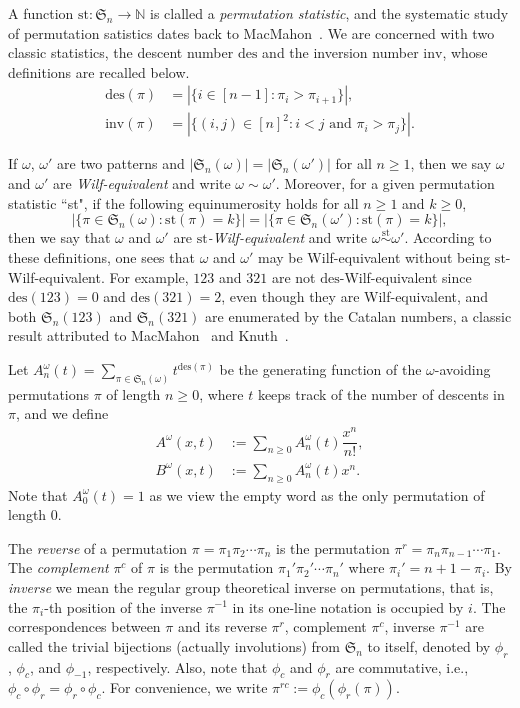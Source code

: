 \documentclass[11pt,reqno]{amsart}
\numberwithin{equation}{section}
\theoremstyle{plain}
\theoremstyle{definition}
\renewcommand{\S}{\mathfrak{S}}
\def\des{\mathrm{des}}
\def\st{\mathrm{st}}
\def\inv{\mathrm{inv}}
\begin{document}
A function $\st:\S_n \to \mathbb{N} $ is clalled a \textit{permutation statistic}, and the systematic study of permutation
satistics dates back to MacMahon~\cite{mac60}. We are concerned with two classic statistics, the descent number $\des$ and the inversion number $\inv$, whose definitions are recalled below.
\begin{align*} 
\des(\pi) &= |\{i \in [n-1]:\pi_i>\pi_{i+1}\}|,\\
\inv(\pi) &= |\{(i,j)\in [n]^2: i<j \text{ and } \pi_i>\pi_j\}|.
\end{align*}

If $\omega$, $\omega '$ are two patterns and $|\S_n(\omega )|=|\S_n(\omega ')|$ for all $n\ge 1$, then we say $\omega $ and $\omega '$ are \textit{Wilf-equivalent} and write $\omega  \sim \omega '$.
Moreover, for a given permutation statistic ``st", if the following equinumerosity holds for all $n\ge 1$ and $k\ge 0$, 
$$|\{\pi \in \S_n(\omega ): \st(\pi)=k\}|=|\{\pi \in \S_n(\omega '): \st(\pi)=k\}|,$$ 
then we say that $\omega $ and $\omega '$ are \textit{$\st$-Wilf-equivalent} and write $\omega  \overset{\st}{\sim} \omega '$. According to these definitions, one sees that $\omega $ and $\omega '$ may be Wilf-equivalent without being $\st$-Wilf-equivalent. For example, $123$ and $321$ are not $\des$-Wilf-equivalent since $\des(123)=0$ and $\des(321)=2$, even though they are Wilf-equivalent, and both $\S_n(123)$ and $\S_n(321)$ are enumerated by the Catalan numbers, a classic result attributed to MacMahon~\cite{mac60} and Knuth~\cite{knu75}.

Let $A_n^{\omega}(t)=\sum_{\pi \in \S_n(\omega)} t^{\des(\pi)}$ be the generating function of the $\omega$-avoiding permutations $\pi$ of length $n\geq 0$, where $t$ keeps track of the number of descents in $\pi$, and we define
\begin{align*}
A^{\omega}(x,t) &:= \sum_{n\ge 0} A_n^{\omega}(t)\dfrac{x^n}{n!},\\
B^{\omega}(x,t) &:= \sum_{n\ge 0} A_n^{\omega}(t) x^n.
\end{align*} 
Note that $A_0^{\omega}(t)=1$ as we view the empty word as the only permutation of length $0$.

The \textit{reverse} of a permutation $\pi=\pi_1\pi_2\cdots \pi_n$ is the permutation $\pi^{r}=\pi_n\pi_{n-1}\cdots\pi_1$.
The \textit{complement} $\pi^{c}$ of $\pi$ is the permutation $\pi_1'\pi_2'\cdots\pi_n'$ where $\pi_i'=n+1-\pi_i$. By \textit{inverse} we mean the regular group theoretical inverse on permutations, that is, the $\pi_{i}$-th position of the inverse $\pi^{-1}$ in its one-line notation is occupied by $i$. The correspondences between $\pi$ and its reverse $\pi^r$, complement $\pi^c$, inverse $\pi^{-1}$ are called the trivial bijections (actually involutions) from $\S_n$ to itself,
denoted by $\phi _r$, $\phi_c$, and $\phi_{-1}$, respectively.
Also, note that $\phi_c$ and $\phi_r$ are commutative, i.e., $\phi_c\circ\phi_r=\phi_r\circ\phi_c $.
For convenience, we write $\pi^{rc}:=\phi_c(\phi_r(\pi))$.
\end{document}
